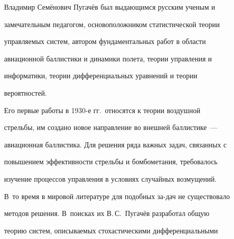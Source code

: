 







   




   




   







    Владимир Семёнович Пугачёв был выдающимся русским ученым и 


замечательным педагогом, основоположником статистической теории 


управляемых систем, автором фундаментальных работ в области 


авиационной баллистики и динамики полета, теории управления и 


информатики, теории дифференциальных уравнений и теории 


вероятностей.


     


    Его первые работы в 1930-е гг.\ относятся к теории воздушной 


стрельбы, им создано новое направление во внешней баллистике~--- 


авиационная баллистика. Для решения ряда важных задач, связанных с 


повышением эффективности стрельбы и бомбометания, требовалось 


изучение процессов управления в условиях случайных возмущений. 


В~то время в мировой литературе для подобных за-\linebreak дач не существовало 


методов решения. В~поисках их В.\,С.~Пуга\-чёв разработал общую 


теорию систем, описываемых стохастическими дифференциальными 


